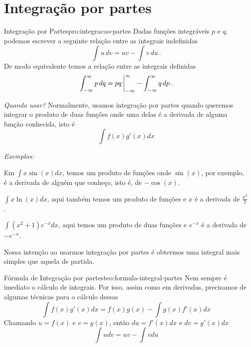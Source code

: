 \section{Integração por partes}
\label{sec:Integracao_por_partes}

\begin{proposicao}{Integração por Partes}{pro:integracao-partes}
  Dadas funções integráveis $p$ e $q$, podemos escrever a seguinte relação
  entre as integrais indefinidas
  \[
  \int u\,dv = uv - \int v\,du \,.
  \]
  De modo equivalente temos a relação entre as integrais definidas
  \[
  \int_{-\infty}^\infty p\,dq = pq \, \bigg\rvert_{-\infty}^{\infty} - \int_{-\infty}^\infty q\,dp \,.
  \]
\end{proposicao}

\hrulefill


\emph{Quando usar?} Normalmente, usamos integração por partes quando queremos
integrar o produto de duas funções onde uma delas é a derivada de alguma função
conhecida, isto é
\[
  \int f(x) g'(x) dx
\]

\emph{Exemplos:}

Em
\(
  \int x \sin(x) dx
\),
temos um produto de funções onde $\sin(x)$, por
exemplo, é a derivada de alguém que conheço, isto é, de $-\cos(x)$.

\(
  \int x \ln(x) dx
\),
aqui também temos um produto de funções e $x$ é a
derivada de \(\frac{x^2}{2}\).

\(
  \int (x^2+1) e^{-x} dx
\),
aqui temos um produto de duas funções e
$e^{-x}$ é a derivada de $-e^{-x}$.

Nossa intenção ao usarmos integração por partes é obtermos uma integral
mais simples que aquela de partida.

\begin{teorema}{Fórmula de Integração por partes}{teo:formula-integral-partes}
  Nem sempre é imediato o cálculo de integrais.
  Por isso, assim como em derivadas,
  precisamos de algumas técnicas para o cálculo dessas
  \begin{equation}
    \label{eq:formula_partes-1}
    \int f(x) g'(x) dx= f(x) g(x)- \int g(x) f'(x)dx
  \end{equation}
  Chamando $u=f(x)$ e $v=g(x)$, então $du=f'(x)dx$ e $dv=g'(x)dx$
  \begin{equation}
    \label{eq:formula_partes-2}
    \int u dv=uv- \int v du
  \end{equation}
\end{teorema}

